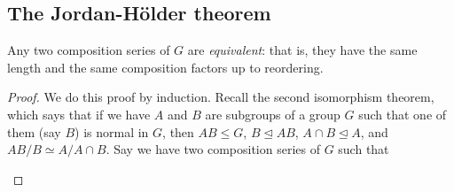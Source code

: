 \subsection{The Jordan-H\"older theorem}
\begin{theorem}
   Any two composition series of $G$ are \emph{equivalent}: that is, they have the same length and the same composition factors up to reordering.
\end{theorem}
\begin{proof}
    We do this proof by induction. Recall the second isomorphism theorem, which says that if we have $A$ and $B$ are subgroups of a group $G$ such that one of them (say $B$) is normal in $G$, then $AB\leq G$, $B\trianglelefteq AB$, $A\cap B \trianglelefteq A$, and $AB /B \simeq A /A\cap B$.
Say we have two composition series of $G$ such that 
            \begin{figure}[H]
                \centering
            \end{figure}


\end{proof}
